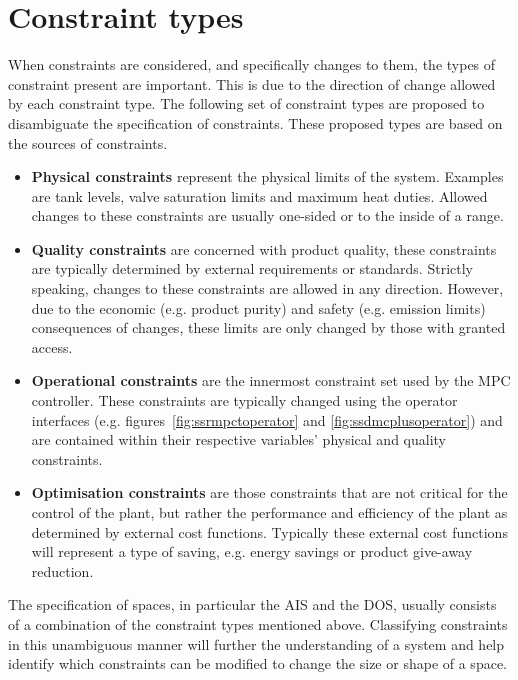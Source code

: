 \section{Constraint types}
When constraints are considered, and specifically changes to them, the types of constraint present are important.
This is due to the direction of change allowed by each constraint type.
The following set of constraint types are proposed to disambiguate the specification of constraints.
These proposed types are based on the sources of constraints.
\begin{itemize}
  \item {\bf Physical constraints} represent the physical limits of the system.
  Examples are tank levels, valve saturation limits and maximum heat duties.
  Allowed changes to these constraints are usually one-sided or to the inside of a range.
  \item {\bf Quality constraints} are concerned with product quality, these constraints are typically determined by external requirements or standards.
  Strictly speaking, changes to these constraints are allowed in any direction.
  However, due to the economic (e.g. product purity) and safety (e.g. emission limits) consequences of changes, these limits are only changed by those with granted access.
  \item {\bf Operational constraints} are the innermost constraint set used by the MPC controller.
  These constraints are typically changed using the operator interfaces (e.g. figures~\ref{fig:ssrmpctoperator} and \ref{fig:ssdmcplusoperator}) and are contained within their respective variables' physical and quality constraints.
  \item {\bf Optimisation constraints} are those constraints that are not critical for the control of the plant, but rather the performance and efficiency of the plant as determined by external cost functions.
  Typically these external cost functions will represent a type of saving, e.g. energy savings or product give-away reduction.
\end{itemize}

The specification of spaces, in particular the AIS and the DOS, usually consists of a combination of the constraint types mentioned above.
Classifying constraints in this unambiguous manner will further the understanding of a system and help identify which constraints can be modified to change the size or shape of a space.

